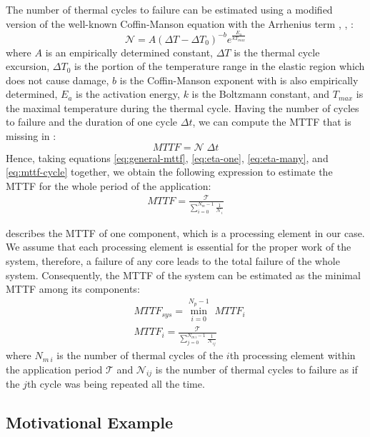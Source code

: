 The number of thermal cycles to failure can be estimated using a modified version of the well-known Coffin-Manson equation with the Arrhenius term \cite{jedec2010}, \cite{xiang2010}, \cite{ciappa2003}:
\begin{equation} \label{eq:cycles-to-failure}
  \mathcal{N} = A (\Delta T - \Delta T_0)^{-b} e^{\frac{E_a}{k T_{max}}}
\end{equation}
where $A$ is an empirically determined constant, $\Delta T$ is the thermal cycle excursion, $\Delta T_0$ is the portion of the temperature range in the elastic region which does not cause damage, $b$ is the Coffin-Manson exponent with is also empirically determined, $E_{a}$ is the activation energy, $k$ is the Boltzmann constant, and $T_{max}$ is the maximal temperature during the thermal cycle. Having the number of cycles to failure and the duration of one cycle $\Delta t$, we can compute the MTTF that is missing in :
\begin{equation} \label{eq:mttf-cycle}
  MTTF = \mathcal{N} \; \Delta t
\end{equation}
Hence, taking equations \eqref{eq:general-mttf}, \eqref{eq:eta-one}, \eqref{eq:eta-many}, and \eqref{eq:mttf-cycle} together, we obtain the following expression to estimate the MTTF for the whole period of the application:
\begin{align} \label{eq:one-mttf}
  MTTF = \frac{\mathcal{T}}{\sum_{i=0}^{N_m - 1} \frac{1}{\mathcal{N}_i}}
\end{align}

 describes the MTTF of one component, which is a processing element in our case. We assume that each processing element is essential for the proper work of the system, therefore, a failure of any core leads to the total failure of the whole system. Consequently, the MTTF of the system can be estimated as the minimal MTTF among its components:
\begin{align}
  & MTTF_{sys} = \min_{i=0}^{N_p - 1} \; MTTF_i \label{eq:mttf-system} \\
  & MTTF_i = \frac{\mathcal{T}}{\sum_{j=0}^{N_{m \: i} - 1} \frac{1}{\mathcal{N}_{ij}}} \nonumber
\end{align}
where $N_{m \: i}$ is the number of thermal cycles of the $i$th processing element within the application period $\mathcal{T}$ and $\mathcal{N}_{ij}$ is the number of thermal cycles to failure as if the $j$th cycle was being repeated all the time.

\subsection{Motivational Example} \label{sec:motivation}


